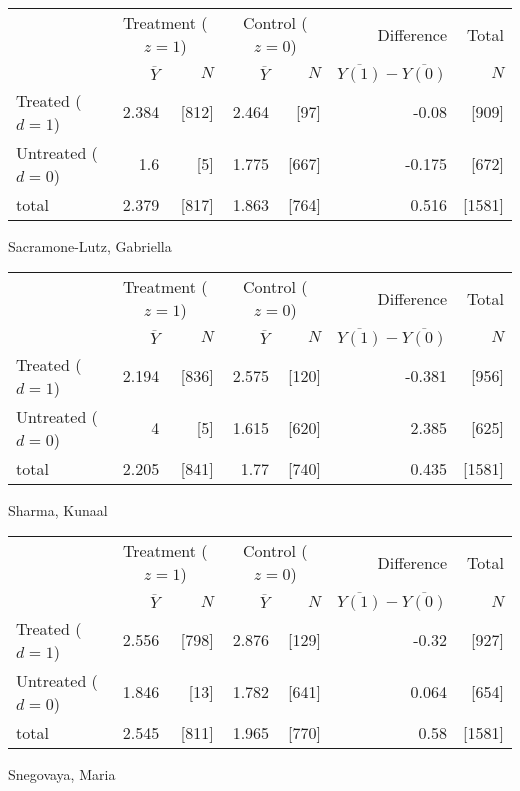 \documentclass[11pt,notitlepage]{article}
\begin{document}
\begin{table}[h!]
\begin{center}
\begin{tabular}{l|rr|rr|rr}
  \hline
 & \multicolumn{2}{c|}{Treatment ($z=1$)} & \multicolumn{2}{c|}{Control ($z=0$)} & Difference & Total \\
 & $\overline{Y}$ & $N$ & $\overline{Y}$ & $N$ & $\overline{Y(1)} - \overline{Y(0)}$ & $N$ \\ 
  \hline
Treated ($d=1$) &  2.384 & [812] & 2.464 & [97] & -0.08 & [909] \\ 
  Untreated ($d=0$) & 1.6 & [5] & 1.775 & [667] & -0.175 & [672] \\
  \hline 
  total & 2.379 & [817] & 1.863 & [764] & 0.516 & [1581] \\ 
   \hline
\end{tabular}
\end{center}
\end{table}
Sacramone-Lutz, Gabriella

\begin{table}[h!]
\begin{center}
\begin{tabular}{l|rr|rr|rr}
  \hline
 & \multicolumn{2}{c|}{Treatment ($z=1$)} & \multicolumn{2}{c|}{Control ($z=0$)} & Difference & Total \\
 & $\overline{Y}$ & $N$ & $\overline{Y}$ & $N$ & $\overline{Y(1)} - \overline{Y(0)}$ & $N$ \\ 
  \hline
Treated ($d=1$) &  2.194 & [836] & 2.575 & [120] & -0.381 & [956] \\ 
  Untreated ($d=0$) & 4 & [5] & 1.615 & [620] & 2.385 & [625] \\ 
  \hline
  total & 2.205 & [841] & 1.77 & [740] & 0.435 & [1581] \\ 
   \hline
\end{tabular}
\end{center}
\end{table}
Sharma, Kunaal

\begin{table}[h!]
\begin{center}
\begin{tabular}{l|rr|rr|rr}
  \hline
 & \multicolumn{2}{c|}{Treatment ($z=1$)} & \multicolumn{2}{c|}{Control ($z=0$)} & Difference & Total \\
 & $\overline{Y}$ & $N$ & $\overline{Y}$ & $N$ & $\overline{Y(1)} - \overline{Y(0)}$ & $N$ \\ 
  \hline
Treated ($d=1$) &  2.556 & [798] & 2.876 & [129] & -0.32 & [927] \\ 
  Untreated ($d=0$) & 1.846 & [13] & 1.782 & [641] & 0.064 & [654] \\ 
  \hline
  total & 2.545 & [811] & 1.965 & [770] & 0.58 & [1581] \\ 
   \hline
\end{tabular}
\end{center}
\end{table}
Snegovaya, Maria
\end{document}
